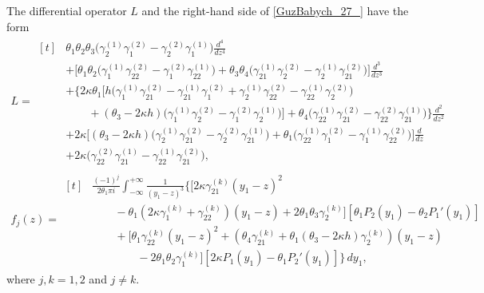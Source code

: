 The differential operator $L$ and the right-hand side of \eqref{GuzBabych_27_} have the form
\begin{equation}\label{GuzBabych_28_}
	\begin{array}{l}
		\displaystyle
		L =
		\begin{aligned}[t]
			&\theta_1\theta_2\theta_3
			\Big(\gamma_2^{(1)}\gamma_1^{(2)}-\gamma_2^{(2)}\gamma_1^{(1)}\Big)
			\frac{d^4}{dz^4}
			\\
			&+
			\Big[
			\theta_1\theta_2
			\Big(\gamma_1^{(1)}\gamma_{22}^{(2)}-\gamma_1^{(2)}\gamma_{22}^{(1)}\Big)
			+
			\theta_3\theta_4
			\Big(\gamma_{21}^{(1)}\gamma_2^{(2)}-\gamma_2^{(1)}\gamma_{21}^{(2)}\Big)
			\Big]
			\frac{d^3}{dz^3}
			\\
			&+
			\Big\{
			2\kappa\theta_1
			\Big[
			h\Big(\gamma_1^{(1)}\gamma_{21}^{(2)}-\gamma_{21}^{(1)}\gamma_1^{(2)}
			+\gamma_2^{(1)}\gamma_{22}^{(2)}-\gamma_{22}^{(1)}\gamma_2^{(2)}\Big)
			\\
			&\qquad
			+
			(\theta_3-2\kappa h)
			\Big(\gamma_1^{(1)}\gamma_2^{(2)}-\gamma_1^{(2)}\gamma_2^{(1)}\Big)
			\Big]
			+
			\theta_4
			\Big(\gamma_{22}^{(1)}\gamma_{21}^{(2)}-\gamma_{22}^{(2)}\gamma_{21}^{(1)}\Big)
			\Big\}
			\frac{d^2}{dz^2}
			\\
			&+
			2\kappa
			\Big[
			(\theta_3-2\kappa h)
			\Big(\gamma_2^{(1)}\gamma_{21}^{(2)}-\gamma_2^{(2)}\gamma_{21}^{(1)}\Big)
			+
			\theta_1
			\Big(\gamma_{22}^{(1)}\gamma_1^{(2)}-\gamma_1^{(1)}\gamma_{22}^{(2)}\Big)
			\Big]
			\frac{d}{dz}
			\\
			&+
			2\kappa
			\Big(\gamma_{22}^{(2)}\gamma_{21}^{(1)}-\gamma_{22}^{(1)}\gamma_{21}^{(2)}\Big),
		\end{aligned}
		\\[1.2em]
		\displaystyle
		f_j(z) =
		\begin{aligned}[t]
			&\frac{(-1)^j}{2\theta_1\pi i}
			\int_{-\infty}^{+\infty}
			\frac{1}{(y_1-z)^3}
			\Bigg\{
			\Big[
			2\kappa\gamma_{21}^{(k)}(y_1-z)^2
			\\
			&\qquad
			-\theta_1(2\kappa\gamma_1^{(k)}+\gamma_{22}^{(k)})(y_1-z)
			+2\theta_1\theta_3\gamma_2^{(k)}
			\Big]
			[\theta_1 P_2(y_1)-\theta_2 P_1'(y_1)]
			\\
			&\qquad
			+
			\Big[
			\theta_1\gamma_{22}^{(k)}(y_1-z)^2
			+
			(\theta_4\gamma_{21}^{(k)}
			+\theta_1(\theta_3-2\kappa h)\gamma_2^{(k)})(y_1-z)
			\\
			&\qquad\qquad
			-2\theta_1\theta_2\gamma_1^{(k)}
			\Big]
			[2\kappa P_1(y_1)-\theta_1 P_2'(y_1)]
			\Bigg\}
			\,dy_1 ,
		\end{aligned}
	\end{array}
\end{equation}
where $j,k=1,2$ and $j\ne k$.

